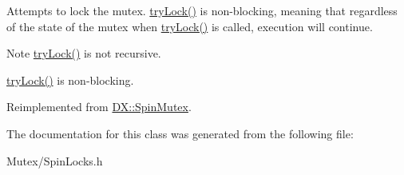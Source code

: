 Attempts to lock the mutex. \hyperlink{class_d_x_1_1_spin_recursive_mutex_a9150334e2741a1de69f177491214cf15}{try\-Lock()} is non-\/blocking, meaning that regardless of the state of the mutex when \hyperlink{class_d_x_1_1_spin_recursive_mutex_a9150334e2741a1de69f177491214cf15}{try\-Lock()} is called, execution will continue. 

\begin{DoxyNote}{Note}
\hyperlink{class_d_x_1_1_spin_recursive_mutex_a9150334e2741a1de69f177491214cf15}{try\-Lock()} is not recursive. 

\hyperlink{class_d_x_1_1_spin_recursive_mutex_a9150334e2741a1de69f177491214cf15}{try\-Lock()} is non-\/blocking. 
\end{DoxyNote}


Reimplemented from \hyperlink{class_d_x_1_1_spin_mutex_a395c28ec936bce90ac562039168a540a}{D\-X\-::\-Spin\-Mutex}.



The documentation for this class was generated from the following file\-:\begin{DoxyCompactItemize}
\item 
Mutex/Spin\-Locks.\-h\end{DoxyCompactItemize}
